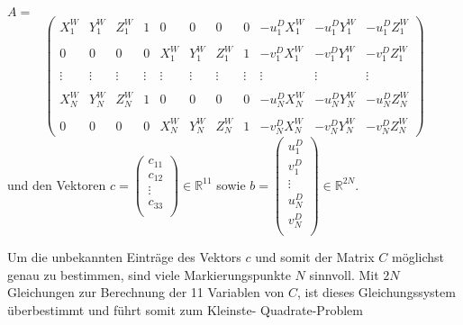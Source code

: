 {$A=$
\[
\left (
\begin{array}{ccccccccccc}
    X^W_1  & Y^W_1 	& Z^W_1	 & 1 	  & 0 	   & 0 		& 0 	 & 0 	  & -u^D_1 X^W_1 & -u^D_1 Y^W_1 & -u^D_1 Z^W_1 \\ 
    &        &        &        &        &        &        &        &              &              &              \\
    0	   & 0		& 0	  	 & 0	  & X^W_1  & Y^W_1 	& Z^W_1	 & 1 	  & -v^D_1 X^W_1 & -v^D_1 Y^W_1 & -v^D_1 Z^W_1 \\
    &        &        &        &        &        &        &        &              &              &              \\ 
    \vdots & \vdots	& \vdots & \vdots & \vdots & \vdots	& \vdots & \vdots & \vdots	  	 & \vdots 	   & \vdots	  	   \\
    &        &        &        &        &        &        &        &              &              &              \\
    X^W_N  & Y^W_N 	& Z^W_N	 & 1 	  & 0 	   & 0 		& 0 	 & 0 	  & -u^D_N X^W_N & -u^D_N Y^W_N & -u^D_N Z^W_N \\ 
    &        &        &        &        &        &        &        &              &              &              \\
    0	   & 0		& 0	  	 & 0	  & X^W_N  & Y^W_N 	& Z^W_N  & 1 	  & -v^D_N X^W_N & -v^D_N Y^W_N & -v^D_N Z^W_N  
\end{array}
\right )
\]
und den Vektoren
$c =
\left(
\begin{array}{c}
    c_{11} \\ c_{12} \\ \vdots \\	c_{33} \\
\end{array}
\right)
\in \mathbb{R}^{11}$
sowie
$b = \left(
\begin{array}{c}
    u^D_1 \\ v^D_1 \\ \vdots \\	u^D_N \\ v^D_N \\
\end{array}
\right) \in \mathbb{R}^{2N}$.

Um die unbekannten Einträge des Vektors $c$ und somit der Matrix $C$ möglichst genau zu bestimmen, sind viele Markierungspunkte $N$ sinnvoll. Mit $2N$ Gleichungen zur Berechnung der 11 Variablen von $C$, ist dieses Gleichungssystem überbestimmt und führt somit zum Kleinste- \linebreak Quadrate-Problem

}
